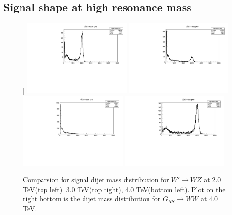 \subsection{Signal shape at high resonance mass}

\begin{figure}[[h!tpb]]
\centering
\includegraphics[width=0.48\textwidth]{figs/sig-high/Wprime2000-sig-shape.pdf} 
\includegraphics[width=0.48\textwidth]{figs/sig-high/Wprime3000-sig-shape.pdf} 
\includegraphics[width=0.48\textwidth]{figs/sig-high/Wprime4000-sig-shape-pre.pdf} 
\includegraphics[width=0.48\textwidth]{figs/sig-high/RSGWWHerwig4000pre.pdf}
\caption{Comparsion for signal dijet mass distribution for $W' \to WZ$ at 2.0 TeV(top left), 3.0 TeV(top right), 4.0 TeV(bottom left). 
Plot on the right bottom is the dijet mass distribution for $G_{RS} \to WW$ at 4.0 TeV. }
\label{figs:sig-pile-up-dijetmass}
\end{figure}

